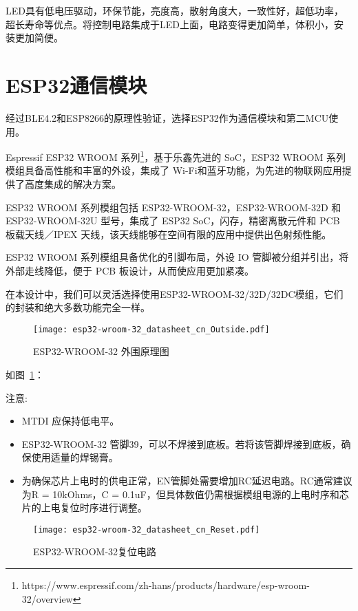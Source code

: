 LED具有低电压驱动，环保节能，亮度高，散射角度大，一致性好，超低功率，超长寿命等优点。将控制电路集成于LED上面，电路变得更加简单，体积小，安装更加简便。


\section{ESP32通信模块}

经过BLE4.2和ESP8266的原理性验证，选择ESP32作为通信模块和第二MCU使用。

Espressif ESP32 WROOM 系列\footnote{https://www.espressif.com/zh-hans/products/hardware/esp-wroom-32/overview}，基于乐鑫先进的 SoC，ESP32 WROOM 系列模组具备高性能和丰富的外设，集成了 Wi-Fi和蓝牙功能，为先进的物联网应用提供了高度集成的解决方案。

ESP32 WROOM 系列模组包括 ESP32-WROOM-32，ESP32-WROOM-32D 和 ESP32-WROOM-32U 型号，集成了 ESP32 SoC，闪存，精密离散元件和 PCB 板载天线／IPEX 天线，该天线能够在空间有限的应用中提供出色射频性能。

ESP32 WROOM 系列模组具备优化的引脚布局，外设 IO 管脚被分组并引出，将外部走线降低，便于 PCB 板设计，从而使应用更加紧凑。

在本设计中，我们可以灵活选择使用ESP32-WROOM-32/32D/32DC模组，它们的封装和绝大多数功能完全一样。

\begin{figure}[htbp]
    \centering
    \texttt{[image: esp32-wroom-32\_datasheet\_cn\_Outside.pdf]}
    \caption{ESP32-WROOM-32 外围原理图}
    \label{fig:ESP32Outside}
\end{figure}

如图~\ref{fig:ESP32Outside}：

注意:

\begin{itemize}
    \item MTDI 应保持低电平。
    \item ESP32-WROOM-32 管脚39，可以不焊接到底板。若将该管脚焊接到底板，确保使用适量的焊锡膏。
    \item 为确保芯片上电时的供电正常，EN管脚处需要增加RC延迟电路。RC通常建议为R = 10kOhms，C = 0.1uF，但具体数值仍需根据模组电源的上电时序和芯片的上电复位时序进行调整。
\end{itemize}

\begin{figure}[htbp]
    \centering
    \texttt{[image: esp32-wroom-32\_datasheet\_cn\_Reset.pdf]}
    \caption{ESP32-WROOM-32复位电路}
    \label{fig:ESP32Reset}
\end{figure}

